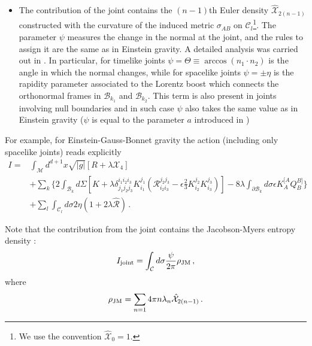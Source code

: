 \documentclass[11pt,letterpaper]{article}
\begin{document}
\begin{itemize}
\item{The contribution of the joint contains the $(n-1)$th Euler density $\hat{\mathcal{X}}_{2(n-1)}$ constructed with the curvature of the induced metric $\sigma_{AB}$ on $\mathcal{C}_l$\footnote{We use the convention $\hat{\mathcal{X}}_{0}=1$.}. The parameter $\psi$ measures the change in the normal at the joint, and the rules to assign it are the same as in Einstein gravity. A detailed analysis was carried out in \cite{Lehner:2016vdi}. In particular, for timelike joints $\psi=\Theta\equiv\arccos(n_1\cdot n_2)$ is the angle in which the normal changes, while for spacelike joints $\psi=\pm\eta$ is the rapidity parameter associated to the Lorentz boost which connects the orthonormal frames in $\mathcal{B}_{k_1}$ and $\mathcal{B}_{k_2}$. This term is also present in joints involving null boundaries and in such case $\psi$ also takes the same value as in Einstein gravity ($\psi$ is equal to the parameter $a$ introduced in \cite{Lehner:2016vdi})  }
\end{itemize}

For example, for Einstein-Gauss-Bonnet gravity the action (including only spacelike joints) reads explicitly
\begin{equation}
\begin{aligned}
I=&\int_{\mathcal{M}}d^{d+1}x\sqrt{|g|}\left[R+\lambda \mathcal{X}_4\right]\\
&+ \sum_{k}\Bigg\{2\int_{\mathcal{B}_k}d\Sigma\left[K+\lambda\delta^{i_1i_2i_3}_{j_1j_2j_3}K^{j_1}_{i_1}\left(\mathcal{R}^{j_2 j_3}_{i_2i_3}-\epsilon \frac{2}{3}K^{j_2}_{i_2}K^{j_3}_{i_3}\right)\right]-8\lambda\int_{\partial\mathcal{B}_k}d\sigma  \epsilon K^{[A}_{A}Q^{B]}_{B}\Bigg\}\\
&+\sum_l\int_{\mathcal{C}_l}d\sigma 2\eta \left(1+2\lambda\hat{\mathcal{R}}\right)\, .
\end{aligned}
\end{equation}

Note that the contribution from the joint contains the Jacobson-Myers entropy density \cite{Jacobson:1993xs}:
\begin{equation}\label{Ijnt1}
I_{\rm joint}=\int_{\mathcal{C}}d\sigma \frac{\psi}{2\pi} \rho_{\rm JM}\, ,
\end{equation}
where 
\begin{equation}
\rho_{\rm JM}=\sum_{n=1}4\pi n\lambda_n\hat{\mathcal{X}}_{2(n-1)}\, .
\end{equation}
\end{document}
